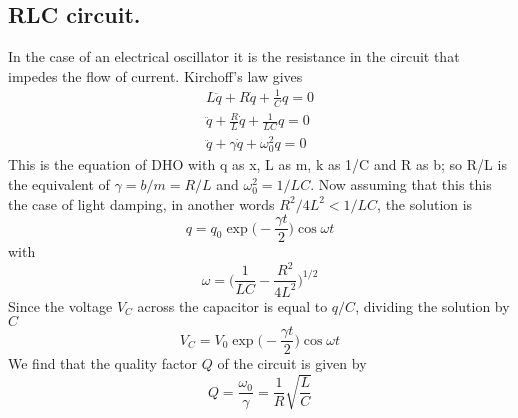 \documentclass[../../../main.tex]{subfiles}
\begin{document}
\subsection{RLC circuit.} In the case of an electrical oscillator it is the resistance in the circuit that impedes the flow of current. Kirchoff's law gives
\begin{align*}
    L\ddot{q}+R\dot{q}+\frac{1}{C}q=0\\
    \ddot{q}+\frac{R}{L}\dot{q}+\frac{1}{LC}q=0\\
    \ddot{q}+\gamma\dot{q}+\omega_0^2q=0
\end{align*}    
This is the equation of DHO with q as x, L as m, k as 1/C and R as b; so R/L is the equivalent of $\gamma=b/m=R/L$ and $\omega_0^2=1/LC$. Now assuming that this this the case of light damping, in another words $ R^2/4L^2<1/LC$, the solution is
\begin{equation*}
    q=q_0\exp\biggl(-\frac{\gamma t}{2}\biggr)\cos\omega t
\end{equation*} 
with\begin{equation*}
    \omega =\biggl(\frac{1}{LC}-\frac{R^2}{4L^2}\biggr)^{1/2}
\end{equation*}Since the voltage $V_C$ across the capacitor is equal to $q/C$, dividing the solution by $C$\begin{equation*}
    V_C=V_0\exp\biggl(-\frac{\gamma t}{2}\biggr)\cos\omega t
\end{equation*}
We find that the quality factor $Q$ of the circuit is given by
\begin{equation*}
    Q=\frac{\omega_0}{\gamma}=  \frac{1}{R}\sqrt{\frac{L}{C}}
\end{equation*}
\end{document}
